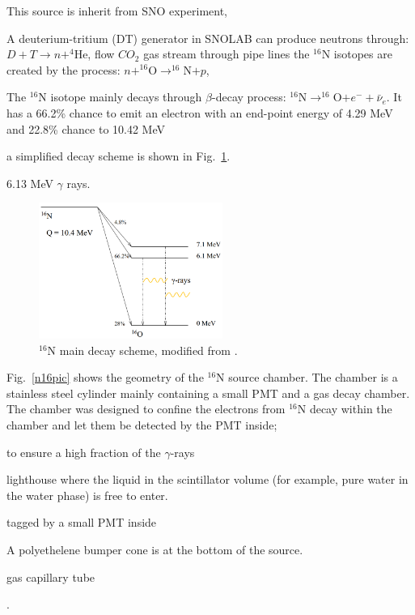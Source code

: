 This source is inherit from SNO experiment\cite{dragowsky1999sudbury,dragowsky200216n,hamer2001energy}, 

A deuterium-tritium (DT) generator in SNOLAB can produce neutrons through: $D+T\to n+^{4}$He, 
flow $CO_2$ gas stream through pipe lines
the $^{16}$N isotopes are created by the process: $n+^{16}$O$\to^{16}$N$+p$,


The $^{16}$N isotope mainly decays through $\beta$-decay process: $^{16}$N$\to ^{16}$O$+e^-+\bar{\nu}_e$.
It has a 66.2\% chance to emit an electron with an end-point energy of 4.29 MeV and 22.8\% chance to 
10.42 MeV

\cite{nndc}

a simplified decay scheme is shown in Fig.~\ref{n16decay}.

6.13 MeV $\gamma$ rays.
\begin{figure}[!htb]
	\centering
	\includegraphics[width=6cm]{n16_decay.png}
	\caption{$^{16}$N main decay scheme, modified from \cite{dragowsky200216n}.}
	\label{n16decay}
\end{figure}


Fig.~\ref{n16pic} shows the geometry of the $^{16}$N source chamber. The chamber is a stainless steel cylinder mainly containing a small PMT and a gas decay chamber. The chamber was designed to confine the electrons from $^{16}$N decay within the chamber and let them be detected by the PMT inside; 


to ensure a high fraction of the $\gamma$-rays 


lighthouse where the liquid in the scintillator volume (for example, pure water in the water phase) is free to enter.


tagged by a small PMT inside

A polyethelene bumper cone is at the bottom of the source.

 



gas capillary tube


 

\cite{dragowsky1999sudbury}.
 

